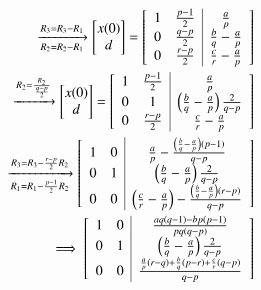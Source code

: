 \documentclass[journal,12pt,twocolumn]{IEEEtran}
\theoremstyle{remark}
\begin{document}
\begin{align}
    \xrightarrow[R_{2}=R_{2}-R_{1}]{R_{3}=R_{3}-R_{1}} \begin{bmatrix}
         x(0)\\
         d\\
     \end{bmatrix}
     =
     \left[\begin{array}{c c|c}
         1&\frac{p-1}{2}&\frac{a}{p}\\
         0&\frac{q-p}{2}&\frac{b}{q}-\frac{a}{p}\\
         0&\frac{r-p}{2}&\frac{c}{r}-\frac{a}{p}\\
     \end{array}\right]\\
     \xrightarrow{R_2=\frac{R_{2}}{\frac{q-p}{2}}}\begin{bmatrix}
         x(0)\\
         d\\
     \end{bmatrix}
     =
     \left[\begin{array}{c c|c}
         1&\frac{p-1}{2}&\frac{a}{p}\\
         0&1&\left(\frac{b}{q}-\frac{a}{p}\right)\frac{2}{q-p}\\
         0&\frac{r-p}{2}&\frac{c}{r}-\frac{a}{p}\\
     \end{array}\right]\\
     \xrightarrow[R_{1}=R_{1}-\frac{p-1}{2}R_{2}]{R_{3}=R_{3}-\frac{r-p}{2}R_{2}}
     \left[\begin{array}{c c|c}
         1&0&\frac{a}{p}-\frac{\left(\frac{b}{q}-\frac{a}{p}\right)\left(p-1\right)}{q-p}\\
         0&1&\left(\frac{b}{q}-\frac{a}{p}\right)\frac{2}{q-p}\\
         0&0&\left(\frac{c}{r}-\frac{a}{p}\right)-\frac{\left(\frac{b}{q}-\frac{a}{p}\right)\left(r-p\right)}{q-p}\\
     \end{array}\right]\\
     \implies
     \left[\begin{array}{c c|c}
         1&0&\frac{aq\left(q-1\right)-bp\left(p-1\right)}{pq\left(q-p\right)}\\
         0&1&\left(\frac{b}{q}-\frac{a}{p}\right)\frac{2}{q-p}\\
         0&0&\frac{\frac{a}{p}\left(r-q\right)+\frac{b}{q}\left(p-r\right)+\frac{c}{r}\left(q-p\right)}{q-p}\\
     \end{array}\right]
 \end{align}
\end{document}
